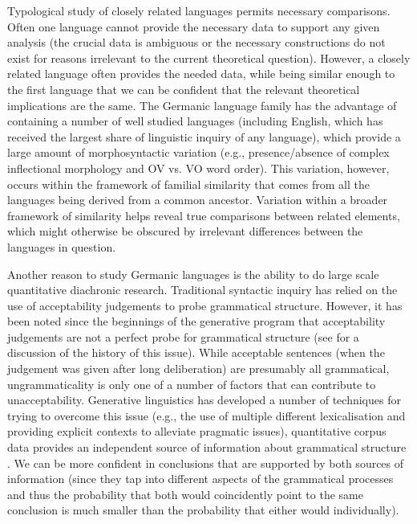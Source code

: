 Typological study of closely related languages permits necessary comparisons. Often one language cannot provide the necessary data to support any given analysis (the crucial data is ambiguous or the necessary constructions do not exist for reasons irrelevant to the current theoretical question). However, a closely related language often provides the needed data, while being similar enough to the first language that we can be confident that the relevant theoretical implications are the same. The Germanic language family has the advantage of containing a number of well studied languages (including English, which has received the largest share of linguistic inquiry of any language), which provide a large amount of morphosyntactic variation (e.g., presence/absence of complex inflectional morphology and OV vs. VO word order). This variation, however, occurs within the framework of familial similarity that comes from all the languages being derived from a common ancestor. Variation within a broader framework of similarity helps reveal true comparisons between related elements, which might otherwise be obscured by irrelevant differences between the languages in question.

Another reason to study Germanic languages is the ability to do large scale quantitative diachronic research. Traditional syntactic inquiry has relied on the use of acceptability judgements to probe grammatical structure. However, it has been noted since the beginnings of the generative program that acceptability judgements are not a perfect probe for grammatical structure (see \citealt{Schutze.1996} for a discussion of the history of this issue). While acceptable sentences (when the judgement was given after long deliberation) are presumably all grammatical, ungrammaticality is only one of a number of factors that can contribute to unacceptability. Generative linguistics has developed a number of techniques for trying to overcome this issue (e.g., the use of multiple different lexicalisation and providing explicit contexts to alleviate pragmatic issues), quantitative corpus data provides an independent source of information about grammatical structure \citep[and other work in this program]{Kroch.1989,Kroch.1994}. We can be more confident in conclusions that are supported by both sources of information (since they tap into different aspects of the grammatical processes and thus the probability that both would coincidently point to the same conclusion is much smaller than the probability that either would individually).

